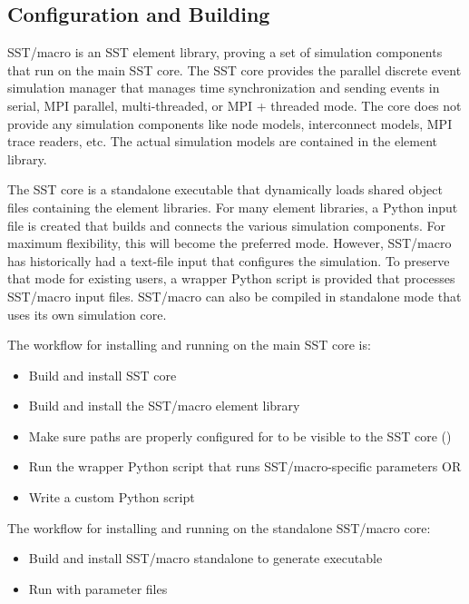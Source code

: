\subsection{Configuration and Building}
\label{subsec:build:configure}

SST/macro is an SST element library, proving a set of simulation components that run on the main SST core.  
The SST core provides the parallel discrete event simulation manager that manages time synchronization and sending events in serial, MPI parallel, multi-threaded, or MPI + threaded mode.  
The core does not provide any simulation components like node models, interconnect models, MPI trace readers, etc.  
The actual simulation models are contained in the element library.  

The SST core is a standalone executable that dynamically loads shared object files containing the element libraries.  
For many element libraries, a Python input file is created that builds and connects the various simulation components.  
For maximum flexibility, this will become the preferred mode.  
However, SST/macro has historically had a text-file input  that configures the simulation.  
To preserve that mode for existing users, a wrapper Python script is provided that processes SST/macro input files.  
SST/macro can also be compiled in standalone mode that uses its own simulation core.

The workflow for installing and running on the main SST core is:
\begin{itemize}
\item	Build and install SST core
\item Build and install the SST/macro element library  
\item Make sure paths are properly configured for  to be visible to the SST core ()
\item Run the  wrapper Python script that runs SST/macro-specific parameters OR
\item Write a custom Python script 
\end{itemize}

The workflow for installing and running on the standalone SST/macro core:
\begin{itemize}
\item Build and install SST/macro standalone to generate  executable
\item Run  with  parameter files
\end{itemize}


